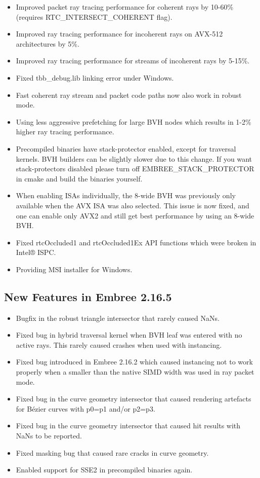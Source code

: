 \begin{itemize}
\tightlist
\item
  Improved packet ray tracing performance for coherent rays by 10-60\%
  (requires RTC\_INTERSECT\_COHERENT flag).
\item
  Improved ray tracing performance for incoherent rays on AVX-512
  architectures by 5\%.
\item
  Improved ray tracing performance for streams of incoherent rays by
  5-15\%.
\item
  Fixed tbb\_debug.lib linking error under Windows.
\item
  Fast coherent ray stream and packet code paths now also work in robust
  mode.
\item
  Using less aggressive prefetching for large BVH nodes which results in
  1-2\% higher ray tracing performance.
\item
  Precompiled binaries have stack-protector enabled, except for
  traversal kernels. BVH builders can be slightly slower due to this
  change. If you want stack-protectors disabled please turn off
  EMBREE\_STACK\_PROTECTOR in cmake and build the binaries yourself.
\item
  When enabling ISAs individually, the 8-wide BVH was previously only
  available when the AVX ISA was also selected. This issue is now fixed,
  and one can enable only AVX2 and still get best performance by using
  an 8-wide BVH.
\item
  Fixed rtcOccluded1 and rtcOccluded1Ex API functions which were broken
  in Intel® ISPC.
\item
  Providing MSI installer for Windows.
\end{itemize}

\subsection{New Features in Embree
2.16.5}\label{new-features-in-embree-2.16.5}

\begin{itemize}
\tightlist
\item
  Bugfix in the robust triangle intersector that rarely caused NaNs.
\item
  Fixed bug in hybrid traversal kernel when BVH leaf was entered with no
  active rays. This rarely caused crashes when used with instancing.
\item
  Fixed bug introduced in Embree 2.16.2 which caused instancing not to
  work properly when a smaller than the native SIMD width was used in
  ray packet mode.
\item
  Fixed bug in the curve geometry intersector that caused rendering
  artefacts for Bézier curves with p0=p1 and/or p2=p3.
\item
  Fixed bug in the curve geometry intersector that caused hit results
  with NaNs to be reported.
\item
  Fixed masking bug that caused rare cracks in curve geometry.
\item
  Enabled support for SSE2 in precompiled binaries again.
\end{itemize}


